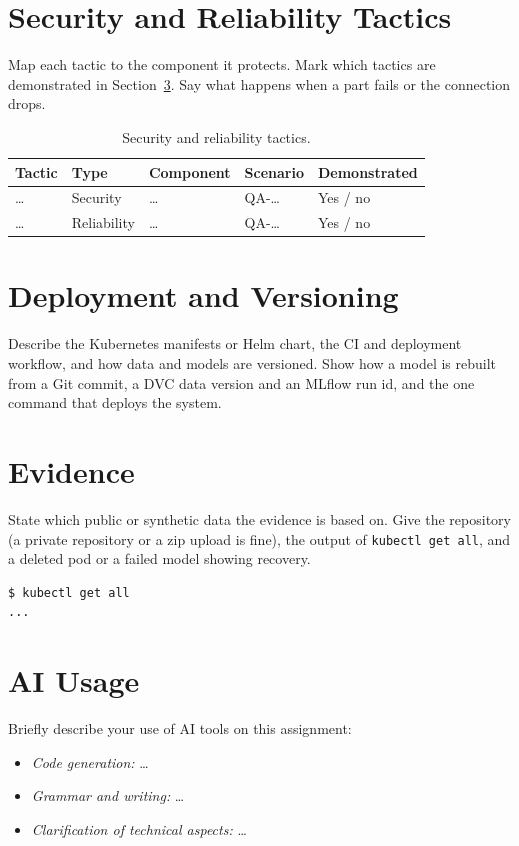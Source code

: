 \documentclass[report]{itvest}
\begin{document}
\section{Security and Reliability Tactics}

Map each tactic to the component it protects. Mark which tactics are
demonstrated in Section~\ref{sec:evidence}. Say what happens when a part
fails or the connection drops.

\begin{table}[h]
  \centering
  \begin{tabularx}{\textwidth}{XlXll}
    \toprule
    Tactic & Type & Component & Scenario & Demonstrated \\
    \midrule
    \ldots & Security & \ldots & QA-\ldots & Yes / no \\
    \ldots & Reliability & \ldots & QA-\ldots & Yes / no \\
    \bottomrule
  \end{tabularx}
  \caption{Security and reliability tactics.}
  \label{tab:tactics}
\end{table}

\section{Deployment and Versioning}

Describe the Kubernetes manifests or Helm chart, the CI and deployment
workflow, and how data and models are versioned. Show how a model is
rebuilt from a Git commit, a DVC data version and an MLflow run id, and
the one command that deploys the system.

\section{Evidence}
\label{sec:evidence}

State which public or synthetic data the evidence is based on. Give the
repository (a private repository or a zip upload is
fine), the output of \texttt{kubectl get all}, and a deleted pod or a
failed model showing recovery.

\begin{verbatim}
$ kubectl get all
...
\end{verbatim}

\section{AI Usage}

Briefly describe your use of AI tools on this assignment:

\begin{itemize}
  \item \emph{Code generation:} \ldots
  \item \emph{Grammar and writing:} \ldots
  \item \emph{Clarification of technical aspects:} \ldots
\end{itemize}



\end{document}
